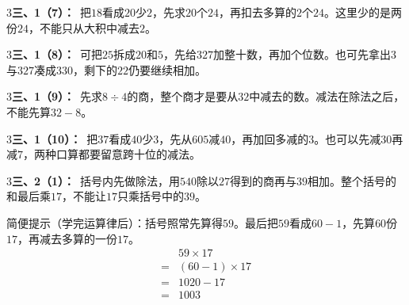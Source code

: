 \documentclass[multi=snippet,border={5bp 20bp 5bp 5bp}]{standalone}
\newenvironment{snippet}[3]{\begin{minipage}{#1bp}\color{answerred}\fontsize{#2}{#3}\selectfont\raggedright}{\end{minipage}}
\begin{document}
\begin{snippet}{505}{11.5}{14}\begin{multicols}{3}\raggedcolumns \textbf{三、1（7）：}\ 把\(18\)\allowbreak 看成\(20\)\allowbreak 少\(2\)\allowbreak ，先求\(20\)\allowbreak 个\(24\)\allowbreak ，再扣去多算的\(2\)\allowbreak 个\(24\)\allowbreak 。这里少的是两份\(24\)\allowbreak ，不能只从大积中减去\(2\)\allowbreak 。\end{multicols}\end{snippet}
\begin{snippet}{505}{11.5}{14}\begin{multicols}{3}\raggedcolumns \textbf{三、1（8）：}\ 可把\(25\)\allowbreak 拆成\(20\)\allowbreak 和\(5\)\allowbreak ，先给\(327\)\allowbreak 加整十数，再加个位数。也可先拿出\(3\)\allowbreak 与\(327\)\allowbreak 凑成\(330\)\allowbreak ，剩下的\(22\)\allowbreak 仍要继续相加。\end{multicols}\end{snippet}
\begin{snippet}{505}{11.5}{14}\begin{multicols}{3}\raggedcolumns \textbf{三、1（9）：}\ 先求\(8\div4\)\allowbreak 的商，整个商才是要从\(32\)\allowbreak 中减去的数。减法在除法之后，不能先算\(32-8\)\allowbreak 。\end{multicols}\end{snippet}
\begin{snippet}{505}{11.5}{14}\begin{multicols}{3}\raggedcolumns \textbf{三、1（10）：}\ 把\(37\)\allowbreak 看成\(40\)\allowbreak 少\(3\)\allowbreak ，先从\(605\)\allowbreak 减\(40\)\allowbreak ，再加回多减的\(3\)\allowbreak 。也可以先减\(30\)\allowbreak 再减\(7\)\allowbreak ，两种口算都要留意跨十位的减法。\end{multicols}\end{snippet}
\begin{snippet}{505}{11.5}{14}\begin{multicols}{3}\raggedcolumns \textbf{三、2（1）：}\ 括号内先做除法，用\(540\)\allowbreak 除以\(27\)\allowbreak 得到的商再与\(39\)\allowbreak 相加。整个括号的和最后乘\(17\)\allowbreak ，不能让\(17\)\allowbreak 只乘括号中的\(39\)\allowbreak 。\par 简便提示（学完运算律后）：括号照常先算得\(59\)\allowbreak 。最后把\(59\)\allowbreak 看成\(60-1\)\allowbreak ，先算\(60\)\allowbreak 份\(17\)\allowbreak ，再减去多算的一份\(17\)\allowbreak 。\[\begin{aligned}&59\times17\\={}&(60-1)\times17\\={}&1020-17\\={}&1003\end{aligned}\]\end{multicols}\end{snippet}
\end{document}
